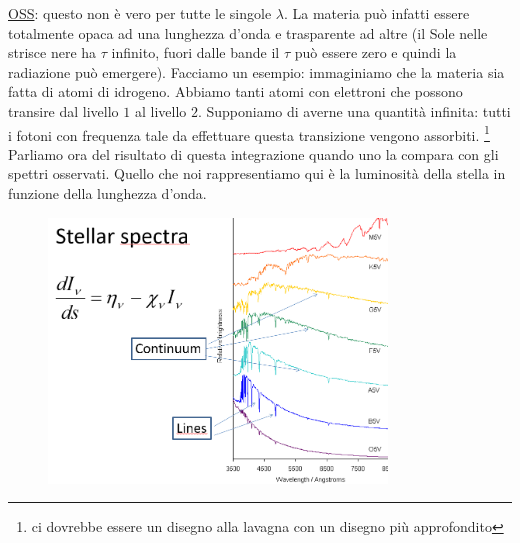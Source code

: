 \documentclass[a4paper,11pt]{article}
\begin{document}
\underline{OSS}: questo non è vero per tutte le singole $\lambda$. La materia può infatti essere totalmente opaca ad una lunghezza d'onda e trasparente ad altre (il Sole nelle strisce nere ha $\tau$ infinito, fuori dalle bande il $\tau$ può essere zero e quindi la radiazione può emergere).
\newline
Facciamo un esempio: immaginiamo che la materia sia fatta di atomi di idrogeno. Abbiamo tanti atomi con elettroni che possono transire dal livello $1$ al livello $2$. Supponiamo di averne una quantità infinita: tutti i fotoni con frequenza tale da effettuare questa transizione vengono assorbiti. \footnote{ci dovrebbe essere un disegno alla lavagna con un disegno più approfondito}
\newline
Parliamo ora del risultato di questa integrazione quando uno la compara con gli spettri osservati. Quello che noi rappresentiamo qui è la luminosità della stella in funzione della lunghezza d'onda.
\begin{figure}[h]
    \centering
    \includegraphics[width=9cm]{28-10.20(spettri_stellari).png}
    \label{fig:spettri stellari}
\end{figure}
\end{document}
